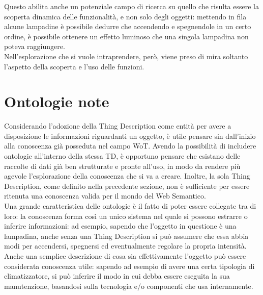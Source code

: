 \documentclass[12pt,a4paper,openright,oneside]{report}
\begin{document}
Questo abilita anche un potenziale campo di ricerca su quello che risulta essere la scoperta dinamica delle funzionalità, e non solo degli oggetti: mettendo in fila alcune lampadine è possibile dedurre che accendendo e spegnendole in un certo ordine, è possibile ottenere un effetto luminoso che una singola lampadina non poteva raggiungere.\\

Nell'esplorazione che si vuole intraprendere, però, viene preso di mira soltanto l'aspetto della scoperta e l'uso delle funzioni.


\section{Ontologie note}
\label{sec:ontologie_note}
Considerando l'adozione della Thing Description come entità per avere a disposizione le informazioni riguardanti un oggetto, è utile pensare sin dall'inizio alla conoscenza già posseduta nel campo WoT. Avendo la possibilità di includere ontologie all'interno della stessa TD, è opportuno pensare che esistano delle raccolte di dati già ben strutturate e pronte all'uso, in modo da rendere più agevole l'esplorazione della conoscenza che si va a creare. Inoltre, la sola Thing Description, come definito nella precedente sezione, non è sufficiente per essere ritenuta una conoscenza valida per il mondo del Web Semantico.\\

Una grande caratteristica delle ontologie è il fatto di poter essere collegate tra di loro: la conoscenza forma così un unico sistema nel quale si possono estrarre o inferire informazioni: ad esempio, sapendo che l'oggetto in questione è una lampadina, anche senza una Thing Description si può assumere che essa abbia modi per accendersi, spegnersi ed eventualmente regolare la propria intensità. Anche una semplice descrizione di cosa sia effettivamente l'oggetto può essere considerata conoscenza utile: sapendo ad esempio di avere una certa tipologia di climatizzatore, si può inferire il modo in cui debba essere eseguita la sua manutenzione, basandosi sulla tecnologia e/o componenti che usa internamente.\\
\end{document}
